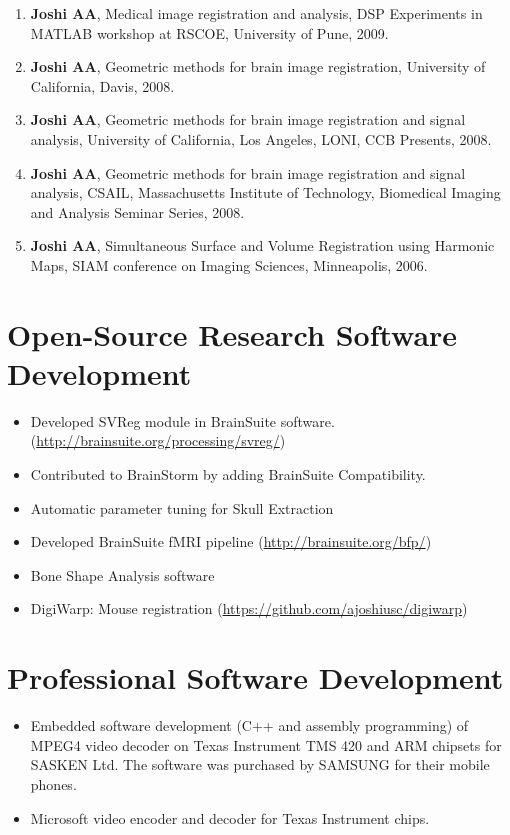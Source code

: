 \documentclass[overlapped,line,letterpaper]{res}
\begin{document}
\begin{resume}
\begin{enumerate}
    \item \textbf{Joshi AA}, Medical image registration and analysis, DSP Experiments in MATLAB workshop at RSCOE, University of Pune, 2009.

    \item \textbf{Joshi AA}, Geometric methods for brain image registration, University of California, Davis, 2008.

    \item \textbf{Joshi AA}, Geometric methods for brain image registration and signal analysis, University of California, Los Angeles, LONI, CCB Presents, 2008.

    \item \textbf{Joshi AA}, Geometric methods for brain image registration and signal analysis, CSAIL, Massachusetts Institute of Technology, Biomedical Imaging and Analysis Seminar Series, 2008.

    \item \textbf{Joshi AA}, Simultaneous Surface and Volume Registration using Harmonic Maps, SIAM conference on Imaging Sciences, Minneapolis, 2006.
\end{enumerate}

\section{Open-Source Research Software Development}
\begin{itemize}
    \item Developed SVReg module in BrainSuite software. (\url{http://brainsuite.org/processing/svreg/})
    \item Contributed to BrainStorm by adding BrainSuite Compatibility.
    \item Automatic parameter tuning for Skull Extraction 
    \item Developed BrainSuite fMRI pipeline (\url{http://brainsuite.org/bfp/})
    \item Bone Shape Analysis software
    \item DigiWarp: Mouse registration (\url{https://github.com/ajoshiusc/digiwarp})
\end{itemize}

\section{Professional Software Development}
\begin{itemize}
    \item Embedded software development (C++ and assembly programming) of MPEG4 video decoder on Texas Instrument TMS 420 and ARM chipsets for SASKEN Ltd. The software was purchased by SAMSUNG for their mobile phones. 
    \item Microsoft video encoder and decoder for Texas Instrument chips.
    \end{itemize}


\end{resume}
\end{document}
